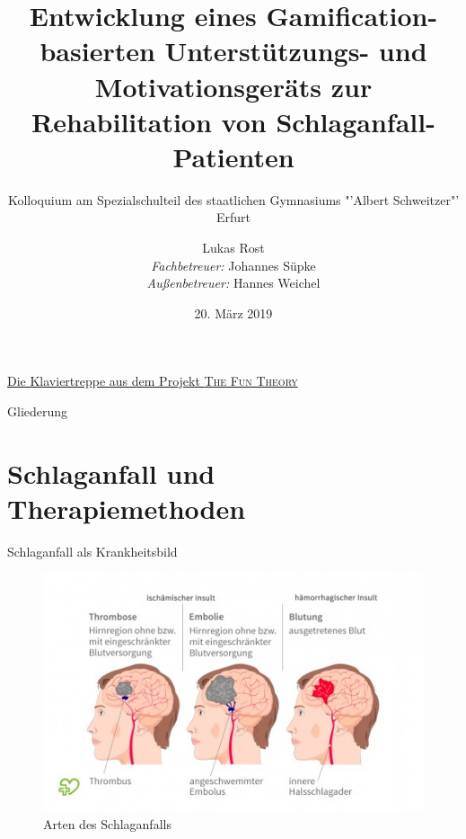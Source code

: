 \documentclass[hyphens]{beamer}
\begin{document}
  \title[Gerät zur Schlaganfall-Rehabilitation]{\LARGE{Entwicklung eines Gamification-basierten Unterstützungs- und Motivationsgeräts zur Rehabilitation von Schlaganfall-Patienten}}
  \subtitle{Kolloquium am Spezialschulteil des staatlichen Gymnasiums "'Albert Schweitzer"' Erfurt}
  \author[Lukas Rost]{Lukas Rost \\ \emph{Fachbetreuer:} Johannes Süpke \\ \emph{Außenbetreuer:} Hannes Weichel}
  \date{20. März 2019}


 \titlepage
 
 \begin{frame}
 \centering \href{https://www.youtube.com/watch?v=SByymar3bds}{Die Klaviertreppe aus dem Projekt \textsc{The Fun Theory}}
\end{frame}

 
 \titlepage

 \begin{frame}{Gliederung}
 \tableofcontents
 \end{frame}

\section{Schlaganfall und Therapiemethoden}

\begin{frame}{Schlaganfall als Krankheitsbild}
\begin{figure}
	\includegraphics[scale=0.6]{pics/sentst}
	\caption{Arten des Schlaganfalls}
\end{figure}
\end{frame}
\end{document}
